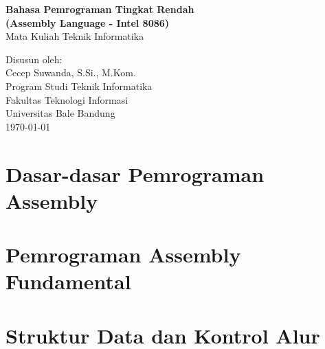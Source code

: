 \documentclass[a4paper,12pt]{book}
\begin{document}
\begin{titlepage}
\begin{center}
\vspace*{2cm}
{\Huge\bfseries Bahasa Pemrograman Tingkat Rendah}\\[0.5cm]
{\Large\bfseries (Assembly Language - Intel 8086)}\\[1cm]
{\large Mata Kuliah Teknik Informatika}\\[2cm]

\vfill

{\large Disusun oleh:}\\
{\large Cecep Suwanda, S.Si., M.Kom.}\\[1cm]

{\large Program Studi Teknik Informatika}\\
{\large Fakultas Teknologi Informasi}\\
{\large Universitas Bale Bandung}\\[1cm]

{\large \today}
\end{center}
\end{titlepage}

\tableofcontents
\newpage

\part{Dasar-dasar Pemrograman Assembly}\label{part:basics}





\part{Pemrograman Assembly Fundamental}\label{part:fundamental}






\part{Struktur Data dan Kontrol Alur}\label{part:structures}




\end{document}
